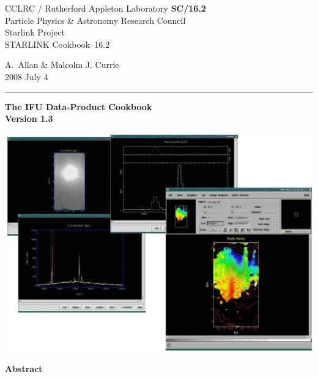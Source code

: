 \documentclass[twoside,11pt]{article}
\newcommand{\stardoccategory}  {STARLINK Cookbook}
\newcommand{\stardocinitials}  {SC}
\newcommand{\stardocnumber}    {16.2}
\newcommand{\stardocauthors}   {A.~Allan \& Malcolm J. Currie}
\newcommand{\stardocdate}      {2008 July 4}
\newcommand{\stardocversion}   {Version 1.3}
\newcommand{\stardoctitle}     {The IFU Data-Product Cookbook}
\newcommand{\stardocname}{\stardocinitials /\stardocnumber}
\newenvironment{latexonly}{}{}
\begin{document}
\thispagestyle{empty}

\begin{latexonly}
   CCLRC / {\sc Rutherford Appleton Laboratory} \hfill {\bf \stardocname}\\
   {\large Particle Physics \& Astronomy Research Council}\\
   {\large Starlink Project\\}
   {\large \stardoccategory\ \stardocnumber}
   \begin{flushright}
   \stardocauthors\\
   \stardocdate
   \end{flushright}
   \vspace{-4mm}
   \rule{\textwidth}{0.5mm}
   \vspace{5mm}
   \begin{center}
   {\Huge\bf  \stardoctitle \\ [2.5ex]}
   {\LARGE\bf \stardocversion \\ [4ex]}
   \end{center}
   \vspace{5mm}

   \begin{center}
   \includegraphics[scale=0.6]{sc16_cover.eps}
   \end{center}

   \vspace{5mm}
   \begin{center}
      {\Large\bf Abstract}
   \end{center}
\end{latexonly}
\end{document}

